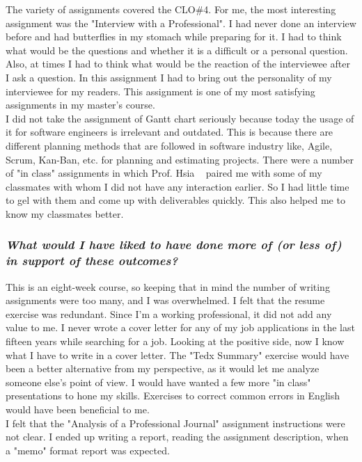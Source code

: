 \documentclass[letterpaper,12pt]{texMemo}
\begin{document}
\begin{singlespacing}
The variety of assignments covered the CLO\#4. For me, the most interesting assignment was the "Interview with a Professional". I had never done an interview before and had butterflies in my stomach while preparing for it. I had to think what would be the questions and whether it is a difficult or a personal question. Also, at times I had to think what would be the reaction of the interviewee after I ask a question. In this assignment I had to bring out the personality of my interviewee for my readers. This assignment is one of my most satisfying assignments in my master's course.\\ 
I did not take the assignment of Gantt chart seriously because today the usage of it for software engineers is irrelevant and outdated. This is because there are different planning methods that are followed in software industry like, Agile, Scrum, Kan-Ban, etc. for planning and estimating projects. There were a number of "in class" assignments in which Prof. Hsia ~\citep{BonnieHs13:online} paired me with some of my classmates with whom I did not have any interaction earlier. So I had little time to gel with them and come up with deliverables quickly. This also helped me to know my classmates better.

\subsubsection*{\textit{What would I have liked to have done more of (or less of) in support of these outcomes?}}
This is an eight-week course, so keeping that in mind the number of writing assignments were too many, and I was overwhelmed. I felt that the resume exercise was redundant. Since I'm a working professional, it did not add any value to me. I never wrote a cover letter for any of my job applications in the last fifteen years while searching for a job. Looking at the positive side, now I know what I have to write in a cover letter. The "Tedx Summary" exercise would have been a better alternative from my perspective, as it would let me analyze someone else's point of view. I would have wanted a few more "in class" presentations to hone my skills. Exercises to correct common errors in English would have been beneficial to me.\\
I felt that the "Analysis of a Professional Journal" assignment instructions were not clear. I ended up writing a report, reading the assignment description, when a "memo" format report was expected.

\end{singlespacing}
\end{document}
